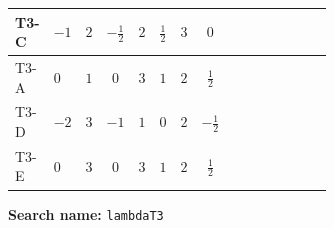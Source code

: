 \documentclass[8pt]{article}
\begin{document}
\begin{landscape}
\begin{longtable}{@{}llcccccc >{\raggedright\arraybackslash}p{0.21\linewidth} >{\raggedright\arraybackslash}p{0.21\linewidth} >{\raggedright\arraybackslash}p{0.21\linewidth}@{}}
\midrule
T3-C & $-1$ & $2$ & $-\frac{1}{2}$ & $2$ & $\frac{1}{2}$ & $3$ & $0$ & \scriptsize\adjustbox{max width=\linewidth}{$\begin{gathered} +2 {\lambda_{12}} {\lambda_{T3}}\end{gathered}$} & \scriptsize\adjustbox{max width=\linewidth}{$\begin{gathered} +2 {\lambda_H} {\lambda_{T3}}\end{gathered}$} & \scriptsize\adjustbox{max width=\linewidth}{$\begin{gathered} +4 {\lambda_{H1}} {\lambda_{T3}}\end{gathered}$} \\
\midrule
T3-A & $0$ & $1$ & $0$ & $3$ & $1$ & $2$ & $\frac{1}{2}$ & \scriptsize\adjustbox{max width=\linewidth}{$\begin{gathered} +2 {\lambda_{12}} {\lambda_{T3}}\end{gathered}$} & \scriptsize\adjustbox{max width=\linewidth}{$\begin{gathered} +2 {\lambda_H} {\lambda_{T3}}\end{gathered}$} & \scriptsize\adjustbox{max width=\linewidth}{$\begin{gathered} +4 {\lambda_{H1}} {\lambda_{T3}}\end{gathered}$} \\
\midrule
T3-D & $-2$ & $3$ & $-1$ & $1$ & $0$ & $2$ & $-\frac{1}{2}$ & \scriptsize\adjustbox{max width=\linewidth}{$\begin{gathered} +2 {\lambda_{12}} {\lambda_{T3}}\end{gathered}$} & \scriptsize\adjustbox{max width=\linewidth}{$\begin{gathered} +2 {\lambda_H} {\lambda_{T3}}\end{gathered}$} & \scriptsize\adjustbox{max width=\linewidth}{$\begin{gathered} +4 {\lambda_{H1}} {\lambda_{T3}}\end{gathered}$} \\
\midrule
T3-E & $0$ & $3$ & $0$ & $3$ & $1$ & $2$ & $\frac{1}{2}$ & \scriptsize\adjustbox{max width=\linewidth}{$\begin{gathered} +2 {\lambda_{12}} {\lambda_{T3}}\end{gathered}$} & \scriptsize\adjustbox{max width=\linewidth}{$\begin{gathered} +2 {\lambda_H} {\lambda_{T3}}\end{gathered}$} & \scriptsize\adjustbox{max width=\linewidth}{$\begin{gathered} +4 {\lambda_{H1}} {\lambda_{T3}}\end{gathered}$} \\
\midrule
\bottomrule
\end{longtable}
\clearpage
\noindent\textbf{Search name: }\texttt{lambdaT3}\par\smallskip

\end{landscape}
\end{document}
